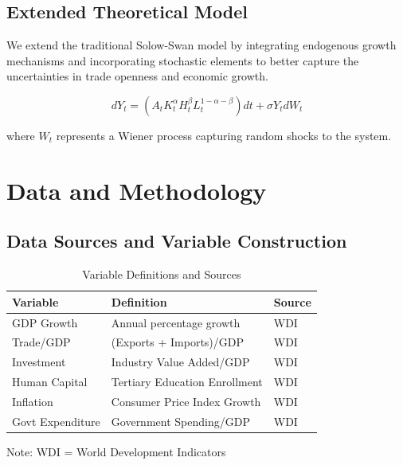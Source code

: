 \documentclass[12pt,a4paper]{article}
\theoremstyle{definition}
\begin{document}
\subsection{Extended Theoretical Model}
We extend the traditional Solow-Swan model by integrating endogenous growth mechanisms and incorporating stochastic elements to better capture the uncertainties in trade openness and economic growth.

\begin{equation}
dY_t = \left( A_t K_t^\alpha H_t^\beta L_t^{1-\alpha-\beta} \right) dt + \sigma Y_t dW_t
\end{equation}

where \( W_t \) represents a Wiener process capturing random shocks to the system.

\section{Data and Methodology}
\subsection{Data Sources and Variable Construction}
\begin{table}[H]
\centering
\caption{Variable Definitions and Sources}
\begin{threeparttable}
\begin{tabular}{lll}
\toprule
Variable & Definition & Source \\
\midrule
GDP Growth & Annual percentage growth & WDI \\
Trade/GDP & (Exports + Imports)/GDP & WDI \\
Investment & Industry Value Added/GDP & WDI \\
Human Capital & Tertiary Education Enrollment & WDI \\
Inflation & Consumer Price Index Growth & WDI \\
Govt Expenditure & Government Spending/GDP & WDI \\
\bottomrule
\end{tabular}
\begin{tablenotes}
\small
\item Note: WDI = World Development Indicators
\end{tablenotes}
\end{threeparttable}
\end{table}
\end{document}
